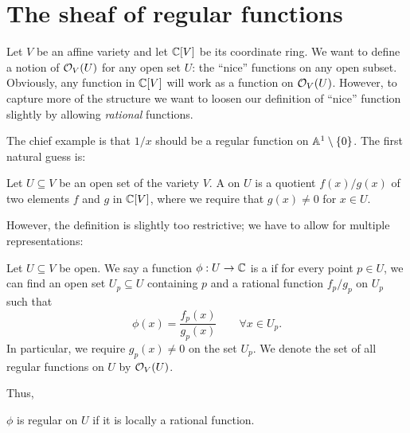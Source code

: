 \section{The sheaf of regular functions}

Let $V$ be an affine variety and let $\mathbb C[V]$ be its coordinate ring.
We want to define a notion of $\mathcal O_V(U)$ for any open set $U$:
the ``nice'' functions on any open subset.
Obviously, any function in $\mathbb C[V]$ will work as a function on $\mathcal O_V(U)$.
However, to capture more of the structure we want to
loosen our definition of ``nice'' function slightly
by allowing \emph{rational} functions.

The chief example is that $1/x$ should be a regular function
on $\mathbb A^1 \setminus \{0\}$.
The first natural guess is:
\begin{definition}
	Let $U \subseteq V$ be an open set of the variety $V$.
	A  on $U$
	is a quotient $f(x) / g(x)$ of two elements $f$ and $g$ in $\mathbb C[V]$,
	where we require that $g(x) \neq 0$ for $x \in U$.
\end{definition}
However, the definition is slightly too restrictive;
we have to allow for multiple representations:
\begin{definition}
	Let $U \subseteq V$ be open.
	We say a function $\phi : U \to \mathbb C$ is a  if for
	every point $p \in U$, we can find an open set $U_p \subseteq U$ containing $p$
	and a rational function $f_p/g_p$ on $U_p$ such that
	\[ \phi(x) = \frac{f_p(x)}{g_p(x)} \qquad \forall x \in U_p. \]
	In particular, we require $g_p(x) \neq 0$ on the set $U_p$.
	We denote the set of all regular functions on $U$ by $\mathcal O_V(U)$.
\end{definition}

Thus,
\begin{moral}
	$\phi$ is regular on $U$ if it is locally a rational function.
\end{moral}

